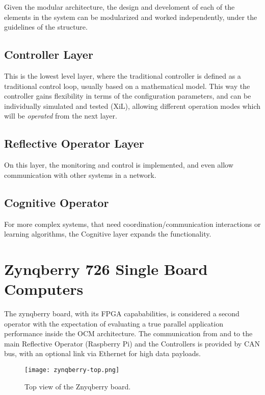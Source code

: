 Given the modular architecture, the design and develoment of each of the elements in the system can be modularized and worked independently, under the guidelines of the structure.

\subsection{Controller Layer}

This is the lowest level layer, where the traditional controller is defined as a traditional control loop, usually based on a mathematical model. This way the controller gains flexibility in terms of the configuration parameters, and can be individually simulated and tested (XiL), allowing different operation modes which will be \textit{operated} from the next layer.

\subsection{Reflective Operator Layer}

On this layer, the monitoring and control is implemented, and even allow communication with other systems in a network.

\subsection{Cognitive Operator}

For more complex systems, that need coordination/communication interactions or learning algorithms, the Cognitive layer expands the functionality.

\section{Zynqberry 726 Single Board Computers}

The zynqberry board, with its FPGA capababilities, is considered a second operator with the expectation of evaluating a true parallel application performance inside the OCM architecture. The communication from and to the main Reflective Operator (Raspberry Pi) and the Controllers is provided by CAN bus, with an optional link via Ethernet for high data payloads.

\begin{figure}[htp]
	\centering
	\texttt{[image: zynqberry-top.png]}
	\caption{Top view of the Znyqberry board.} \label{fig:znyqtop}
\end{figure}

